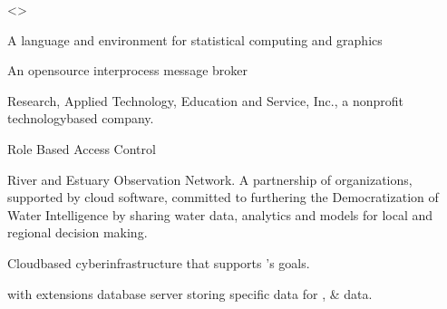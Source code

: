 \documentclass[letterpaper,12pt,english,openany,oneside]{sphinxmanual}
\begin{document}
\begin{description}
\sphinxAtStartPar
\textless{}\textgreater{}

\sphinxAtStartPar
A language and environment for statistical computing and graphics

\sphinxAtStartPar
An open\sphinxhyphen{}source inter\sphinxhyphen{}process message broker

\sphinxAtStartPar
Research, Applied Technology, Education and Service, Inc., a non\sphinxhyphen{}profit technology\sphinxhyphen{}based company.

\sphinxAtStartPar
Role Based Access Control

\sphinxAtStartPar
River and Estuary Observation Network. A partnership of organizations, supported by cloud software, committed to furthering the Democratization of Water Intelligence by sharing water data, analytics and models for local and regional decision making.

\sphinxAtStartPar
Cloud\sphinxhyphen{}based cyber\sphinxhyphen{}infrastructure that supports {\hyperref[\detokenize{glossary:term-REON}]{}}’s goals.

\sphinxAtStartPar
{\hyperref[\detokenize{glossary:term-PostgreSQL}]{}} with {\hyperref[\detokenize{glossary:term-PostGIS}]{}} extensions database server storing {\hyperref[\detokenize{glossary:term-REON}]{}} specific data for {\hyperref[\detokenize{glossary:term-RTHS}]{}}, {\hyperref[\detokenize{glossary:term-REON-WM}]{}} \& {\hyperref[\detokenize{glossary:term-REON.cc}]{}} data.


\end{description}
\end{document}
